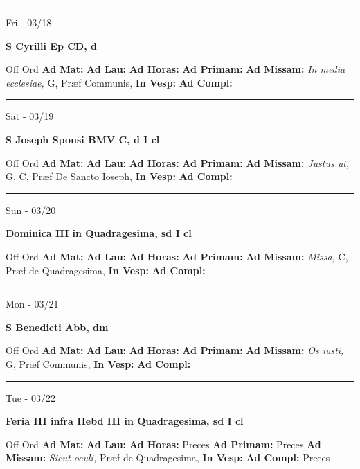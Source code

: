 \documentclass[letterpaper, 10pt]{article}
\begin{document}
\hrule
\begin{center}
Fri - 03/18
\end{center}\textbf{ \large S Cyrilli Ep CD, \textnormal{\normalsize d}}
\begin{justify}
Off Ord
\textbf{Ad Mat: }
\textbf{Ad Lau: }
\textbf{Ad Horas: }
\textbf{Ad Primam: }
\textbf{Ad Missam:} \textit{In media ecclesiae, } G, Præf Communis, 
\textbf{In Vesp: }
\textbf{Ad Compl: }\end{justify}



\hrule
\begin{center}
Sat - 03/19
\end{center}\textbf{ \large S Joseph Sponsi BMV C, \textnormal{\normalsize d I cl}}
\begin{justify}
Off Ord
\textbf{Ad Mat: }
\textbf{Ad Lau: }
\textbf{Ad Horas: }
\textbf{Ad Primam: }
\textbf{Ad Missam:} \textit{Justus ut, } G, C, Præf De Sancto Ioseph, 
\textbf{In Vesp: }
\textbf{Ad Compl: }\end{justify}



\hrule
\begin{center}
Sun - 03/20
\end{center}\textbf{ \large Dominica III in Quadragesima, \textnormal{\normalsize sd I cl}}
\begin{justify}
Off Ord
\textbf{Ad Mat: }
\textbf{Ad Lau: }
\textbf{Ad Horas: }
\textbf{Ad Primam: }
\textbf{Ad Missam:} \textit{Missa, } C, Præf de Quadragesima, 
\textbf{In Vesp: }
\textbf{Ad Compl: }\end{justify}



\hrule
\begin{center}
Mon - 03/21
\end{center}\textbf{ \large S Benedicti Abb, \textnormal{\normalsize dm}}
\begin{justify}
Off Ord
\textbf{Ad Mat: }
\textbf{Ad Lau: }
\textbf{Ad Horas: }
\textbf{Ad Primam: }
\textbf{Ad Missam:} \textit{Os iusti, } G, Præf Communis, 
\textbf{In Vesp: }
\textbf{Ad Compl: }\end{justify}



\hrule
\begin{center}
Tue - 03/22
\end{center}\textbf{ \large Feria III infra Hebd III in Quadragesima, \textnormal{\normalsize sd I cl}}
\begin{justify}
Off Ord
\textbf{Ad Mat: }
\textbf{Ad Lau: }
\textbf{Ad Horas: }Preces
\textbf{Ad Primam: }Preces
\textbf{Ad Missam:} \textit{Sicut oculi, } Præf de Quadragesima, 
\textbf{In Vesp: }
\textbf{Ad Compl: }Preces\end{justify}
\end{document}
